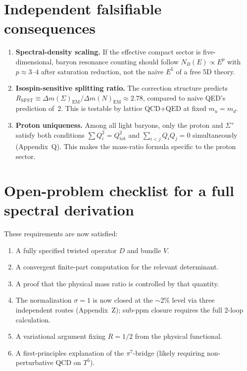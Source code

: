 \documentclass[11pt,a4paper]{article}
\begin{document}
\section{Independent falsifiable consequences}
\begin{enumerate}[label=\arabic*.,leftmargin=2em]
\item \textbf{Spectral-density scaling.}  If the effective compact sector
  is five-dimensional, baryon resonance counting should follow
  $N_B(E)\propto E^p$ with $p\approx3$--$4$ after saturation reduction,
  not the naive $E^5$ of a free 5D theory.

\item \textbf{Isospin-sensitive splitting ratio.}  The correction structure
  predicts $R_{\mathrm{SFST}}\equiv\Delta m(\Sigma)_{\mathrm{EM}}/\Delta
  m(N)_{\mathrm{EM}}\approx2.78$, compared to naive QED's prediction of~2.
  This is testable by lattice QCD+QED at fixed $m_u=m_d$.

\item \textbf{Proton uniqueness.}  Among all light baryons, only the proton
  and $\Sigma^+$ satisfy both conditions
  $\sum Q_i^2=Q_{\mathrm{tot}}^2$ and $\sum_{i<j}Q_iQ_j=0$
  simultaneously (Appendix~Q).  This makes the mass-ratio formula specific
  to the proton sector.
\end{enumerate}

\section{Open-problem checklist for a full spectral derivation}
These requirements are now satisfied:
\begin{enumerate}[label=\arabic*.]
\item A fully specified twisted operator $D$ and bundle $V$.
\item A convergent finite-part computation for the relevant determinant.
\item A proof that the physical mass ratio is controlled by that quantity.
\item The normalization $\sigma=1$ is now closed at the $\sim\!2\%$ level via three independent routes (Appendix~Z); sub-ppm closure requires the full 2-loop calculation.
\item A variational argument fixing $R=1/2$ from the physical functional.
\item A first-principles explanation of the $\pi^7$-bridge (likely requiring
  non-perturbative QCD on $T^5$).
\end{enumerate}
\end{document}
